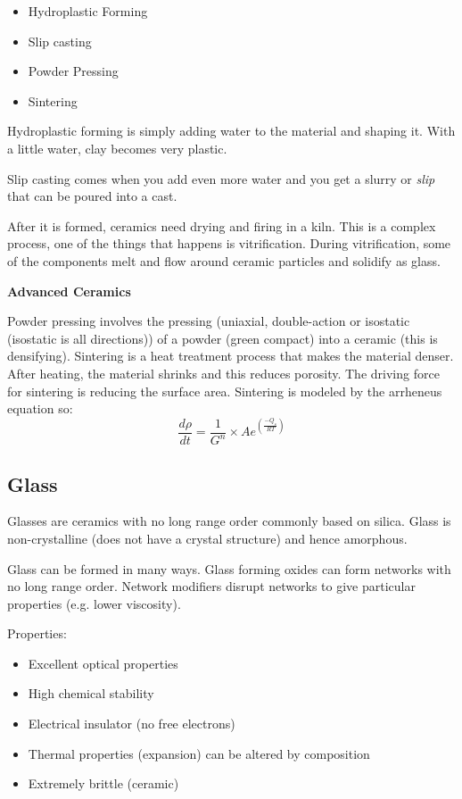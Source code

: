 \documentclass[12pt]{article}
\begin{document}
\begin{itemize}
  \item Hydroplastic Forming
  \item Slip casting 
  \item Powder Pressing
  \item Sintering
\end{itemize}

Hydroplastic forming is simply adding water to the material and shaping it. 
With a little water, clay becomes very plastic.

Slip casting comes when you add even more water and you get a slurry or \textit{slip} that can be poured into a cast.

After it is formed, ceramics need drying and firing in a kiln.
This is a complex process, one of the things that happens is vitrification.
During vitrification, some of the components melt and flow around ceramic particles and solidify as glass. 

\textbf{Advanced Ceramics}

Powder pressing involves the pressing (uniaxial, double-action or isostatic (isostatic is all directions)) of a powder (green compact) into a ceramic (this is densifying).
Sintering is a heat treatment process that makes the material denser.
After heating, the material shrinks and this reduces porosity.
The driving force for sintering is reducing the surface area.
Sintering is modeled by the arrheneus equation so:
\begin{equation*}
  \frac{d\rho}{dt} = \frac{1}{G^n} \times Ae^{(\frac{-Q_s}{RT})}
\end{equation*}

\subsection{Glass}
Glasses are ceramics with no long range order commonly based on silica. 
Glass is non-crystalline (does not have a crystal structure) and hence amorphous.

Glass can be formed in many ways.
Glass forming oxides can form networks with no long range order.
Network modifiers disrupt networks to give particular properties (e.g. lower viscosity).

Properties:
\begin{itemize}
  \item Excellent optical properties
  \item High chemical stability 
  \item Electrical insulator (no free electrons)
  \item Thermal properties (expansion) can be altered by composition
  \item Extremely brittle (ceramic)
\end{itemize}
\end{document}
